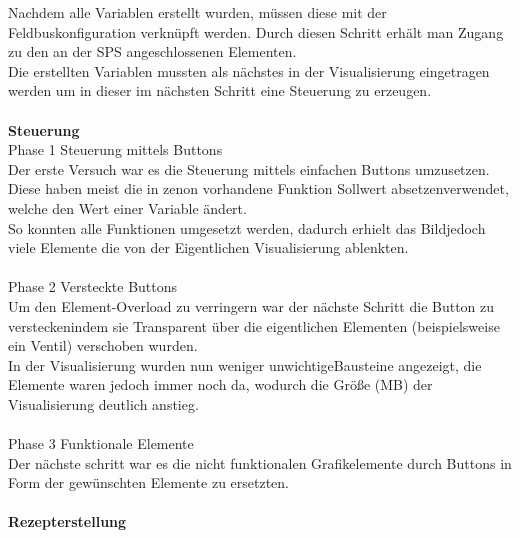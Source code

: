 Nachdem alle Variablen erstellt wurden, müssen diese mit der Feldbuskonfiguration verknüpft werden. Durch diesen Schritt erhält man Zugang zu den an der SPS angeschlossenen Elementen.\\
Die erstellten Variablen mussten als nächstes in der Visualisierung eingetragen werden um in dieser im nächsten Schritt eine Steuerung zu erzeugen.\\
\\

\textbf{Steuerung}\\
Phase 1 Steuerung mittels Buttons\\
	Der erste Versuch war es die Steuerung mittels einfachen Buttons umzusetzen. Diese haben meist die in zenon vorhandene Funktion  \glqq Sollwert absetzen\grqq\space  verwendet, welche den Wert einer Variable ändert.\\
	So konnten alle Funktionen umgesetzt werden, dadurch erhielt das  \glqq Bild\grqq\space  jedoch viele Elemente die von der Eigentlichen Visualisierung ablenkten.\\
\\
Phase 2 Versteckte Buttons\\
	Um den Element-Overload zu verringern war der nächste Schritt die Button zu  \glqq verstecken\grqq\space  indem sie Transparent über die eigentlichen Elementen (beispielsweise ein Ventil) verschoben wurden.\\
	In der Visualisierung wurden nun weniger  \glqq unwichtige\grqq\space  Bausteine angezeigt, die Elemente waren jedoch immer noch da, wodurch die Größe (MB) der Visualisierung deutlich anstieg.\\
\\
Phase 3 Funktionale Elemente\\
	Der nächste schritt war es die nicht funktionalen Grafikelemente durch Buttons in Form der gewünschten Elemente zu ersetzten.\\
\\
\textbf{Rezepterstellung}\\


